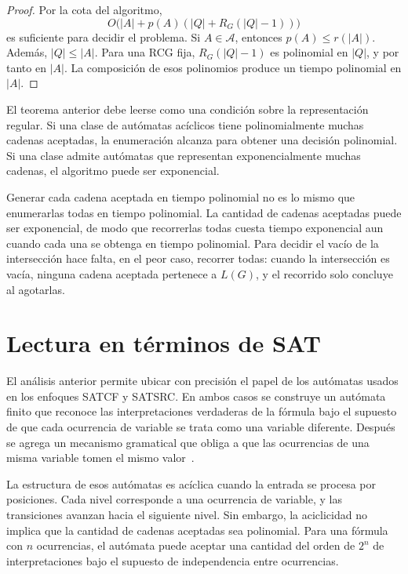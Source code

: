 \documentclass{report}
\theoremstyle{definition}
\theoremstyle{plain}
\theoremstyle{remark}
\begin{document}
\begin{proof}
Por la cota del algoritmo,
\[
  O\bigl( |A| + p(A)(|Q| + R_G(|Q|-1)) \bigr)
\]
es suficiente para decidir el problema. Si $A \in \mathcal{A}$,
entonces $p(A) \le r(|A|)$.
Además, $|Q| \le |A|$. Para una RCG fija, $R_G(|Q|-1)$ es polinomial en
$|Q|$, y por tanto en $|A|$. La composición de esos polinomios produce
un tiempo polinomial en $|A|$.
\end{proof}

El teorema anterior debe leerse como una condición sobre la
representación regular. Si una clase de autómatas acíclicos tiene
polinomialmente muchas cadenas aceptadas, la
enumeración alcanza para obtener una decisión polinomial. Si una clase
admite autómatas que representan exponencialmente muchas cadenas, el
algoritmo puede ser exponencial.

Generar cada cadena aceptada en tiempo polinomial no es lo mismo que
enumerarlas todas en tiempo polinomial. La cantidad de cadenas
aceptadas puede ser exponencial, de modo que recorrerlas todas cuesta
tiempo exponencial aun cuando cada una se obtenga en tiempo polinomial.
Para decidir el vacío de la intersección hace falta, en el peor caso,
recorrer todas: cuando la intersección es vacía, ninguna cadena aceptada
pertenece a $L(G)$, y el recorrido solo concluye al agotarlas.

\section{Lectura en términos de SAT}
\label{sec:lectura-sat}

El análisis anterior permite ubicar con precisión el papel de los
autómatas usados en los enfoques SATCF y SATSRC. En ambos casos se
construye un autómata finito que reconoce las
interpretaciones verdaderas de la fórmula bajo el supuesto de que cada
ocurrencia de variable se trata como una variable diferente. Después se
agrega un mecanismo gramatical que obliga a que las ocurrencias de una
misma variable tomen el mismo valor~\cite{fernandezarias2007,aguileralopez2016}.

La estructura de esos autómatas es acíclica cuando la entrada se procesa
por posiciones. Cada nivel corresponde a una ocurrencia de variable, y
las transiciones avanzan hacia el siguiente nivel. Sin embargo, la
aciclicidad no implica que la cantidad de cadenas aceptadas sea
polinomial. Para una fórmula con $n$ ocurrencias, el autómata puede
aceptar una cantidad del orden de $2^n$ de interpretaciones bajo el
supuesto de independencia entre ocurrencias.
\end{document}
